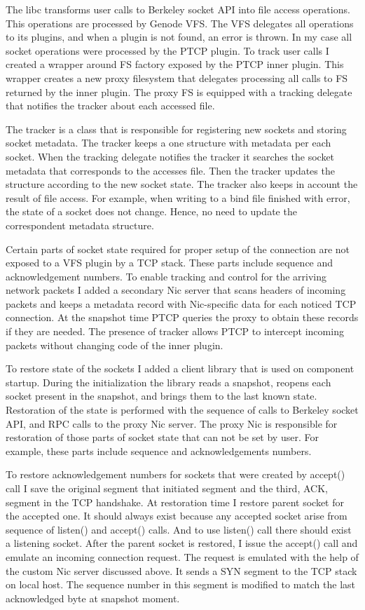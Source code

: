 The libc transforms user calls to Berkeley socket API into file access
operations. This operations are processed by Genode VFS. The VFS delegates all
operations to its plugins, and when a plugin is not found, an error is thrown.
In my case all socket operations were processed by the PTCP plugin. To track
user calls I created a wrapper around FS factory exposed by the PTCP inner
plugin. This wrapper creates a new proxy filesystem that delegates processing
all calls to FS returned by the inner plugin. The proxy FS is equipped with a
tracking delegate that notifies the tracker about each accessed file.

The tracker is a class that is responsible for registering new sockets and
storing socket metadata. The tracker keeps a one structure with metadata per
each socket. When the tracking delegate notifies the tracker it searches the
socket metadata that corresponds to the accesses file. Then the tracker
updates the structure according to the new socket state. The tracker also keeps
in account the result of file access. For example, when writing to a bind file
finished with error, the state of a socket does not change. Hence, no need to
update the correspondent metadata structure.

Certain parts of socket state required for proper setup of the connection are
not exposed to a VFS plugin by a TCP stack. These parts include sequence and
acknowledgement numbers. To enable tracking and control for the arriving
network packets I added a secondary Nic server that scans headers of incoming
packets and keeps a metadata record with Nic-specific data for each noticed TCP
connection. At the snapshot time PTCP queries the proxy to obtain these records
if they are needed. The presence of tracker allows PTCP to intercept incoming
packets without changing code of the inner plugin. 

To restore state of the sockets I added a client library that is used on
component startup. During the initialization the library reads a snapshot,
reopens each socket present in the snapshot, and brings them to the last known
state. Restoration of the state is performed with the sequence of calls to
Berkeley socket API, and RPC calls to the proxy Nic server. The proxy Nic is
responsible for restoration of those parts of socket state that can not be set
by user. For example, these parts include sequence and acknowledgements
numbers. 

To restore acknowledgement numbers for sockets that were created by accept()
call I save the original segment that initiated segment and the third, ACK,
segment in the TCP handshake. At restoration time I restore parent socket for
the accepted one. It should always exist because any accepted socket arise from
sequence of listen() and accept() calls. And to use listen() call there should
exist a listening socket. After the parent socket is restored, I issue the
accept() call and emulate an incoming connection request. The request is
emulated with the help of the custom Nic server discussed above. It sends a SYN
segment to the TCP stack on local host. The sequence number in this segment is
modified to match the last acknowledged byte at snapshot moment.

